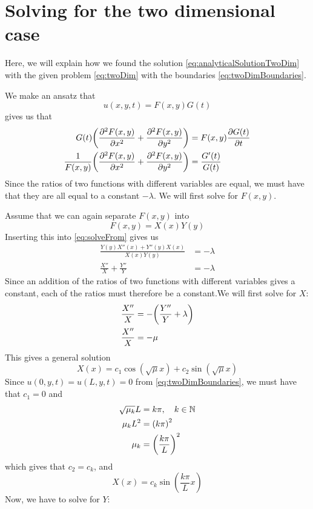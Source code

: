
\section{Solving for the two dimensional case}\label{twodimappendix}
Here, we will explain how we found the solution \vref{eq:analyticalSolutionTwoDim} with the given problem \vref{eq:twoDim} with the boundaries \vref{eq:twoDimBoundaries}.


We make an ansatz that
\[
u(x,y,t) = F(x,y)G(t)
\]
 gives us that
\begin{align}
G(t)\qty(\pdv[2]{F(x,y)}{x}+ \pdv[2]{F(x,y)}{y} ) &= F(x,y)\pdv{G(t)}{t} \nonumber\\
\frac{1}{F(x,y)}\qty(\pdv[2]{F(x,y)}{x}+ \pdv[2]{F(x,y)}{y} ) &= \frac{G'(t)}{G(t)} \label{eq:solveFrom}
\end{align}
Since the ratios of two functions with different variables are equal, we must have that they are all equal to a constant \(-\lambda\). We will first solve for \(F(x,y)\).

Assume that we can again separate \(F(x,y)\) into
\[
F(x,y) = X(x)Y(y)
\]
Inserting this into \vref{eq:solveFrom} gives us
\begin{align*}
\frac{Y(y)X''(x)+ Y''(y)X(x)}{X(x)Y(y)} &= -\lambda \\
\frac{X''}{X}+ \frac{Y''}{Y} &= -\lambda
\end{align*}
Since an addition of the ratios of two functions with different variables gives a constant, each of the ratios must therefore be a constant.We will first solve for \(X\):
\begin{align}
\frac{X''}{X} &= -\qty(\frac{Y''}{Y} +\lambda) \label{eq:mysteriousMu}\\
\frac{X''}{X} &= -\mu \nonumber
\end{align}
This gives a general solution
\[
X(x) = c_1\cos(\sqrt{\mu}x) + c_2\sin(\sqrt{\mu}x)
\]
Since \(u(0,y,t) = u(L,y,t) = 0\) from \vref{eq:twoDimBoundaries}, we must have that \(c_1 = 0\) and
\begin{align}
\sqrt{\mu_k}L &= k\pi \nonumber , \quad k \in \mathbb{N}\\
\mu_k L^2 &= \qty(k\pi)^2 \nonumber \\
 \mu_k  &=\qty(\frac{k\pi}{L})^2 \label{eq:twoDimMu}
\end{align}
which gives that \(c_2 = c_k\), and
\[
X(x) = c_k\sin(\frac{k\pi}{L}x)
\]
Now, we have to solve for \(Y\):

